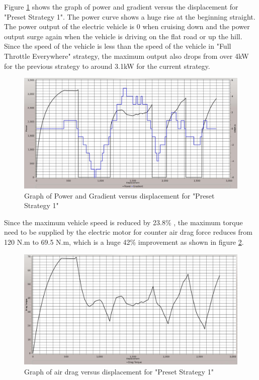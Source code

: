 Figure \ref{im:1_2} shows the graph of power and gradient versus the displacement for "Preset Strategy 1". The power curve shows a huge rise at the beginning straight. The power output of the electric vehicle is 0 when cruising down and the power output surge again when the vehicle is driving on the flat road or up the hill. Since the speed of the vehicle is less than the speed of the vehicle in "Full Throttle Everywhere" strategy, the maximum output also drops from over 4kW for the previous strategy to around 3.1kW for the current strategy.

\begin{figure}[htb]
	\centering
	\includegraphics[width=6in]{images/1_2.jpg}
	\caption{Graph of Power and Gradient versus displacement for "Preset Strategy 1"}
	\label{im:1_2}
\end{figure}

Since the maximum vehicle speed is reduced by 23.8\% , the maximum torque need to be supplied by the electric motor for counter air drag force reduces from 120 N.m to 69.5 N.m, which is a huge 42\% improvement as shown in figure \ref{im:1_3}.

\begin{figure}[htb]
	\centering
	\includegraphics[width=6in]{images/1_3.jpg}
	\caption{Graph of air drag versus displacement for "Preset Strategy 1"}
	\label{im:1_3}
\end{figure}

